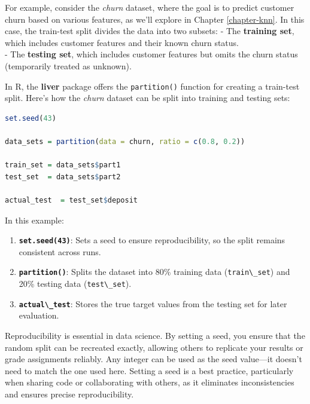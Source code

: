 \documentclass[
]{book}
\newcommand{\passthrough}[1]{#1}
\providecommand{\tightlist}{%
  \setlength{\itemsep}{0pt}\setlength{\parskip}{0pt}}
\theoremstyle{definition}
\theoremstyle{definition}
\theoremstyle{definition}
\theoremstyle{definition}
\theoremstyle{remark}
\begin{document}
For example, consider the \emph{churn} dataset, where the goal is to predict customer churn based on various features, as we'll explore in Chapter \ref{chapter-knn}. In this case, the train-test split divides the data into two subsets:
- The \textbf{training set}, which includes customer features and their known churn status.\\
- The \textbf{testing set}, which includes customer features but omits the churn status (temporarily treated as unknown).

In R, the \textbf{liver} package offers the \passthrough{\lstinline!partition()!} function for creating a train-test split. Here's how the \emph{churn} dataset can be split into training and testing sets:

\begin{lstlisting}[language=R]
set.seed(43)

data_sets = partition(data = churn, ratio = c(0.8, 0.2))

train_set = data_sets$part1
test_set  = data_sets$part2

actual_test  = test_set$deposit
\end{lstlisting}

In this example:

\begin{enumerate}
\def\labelenumi{\arabic{enumi}.}
\tightlist
\item
  \textbf{\passthrough{\lstinline!set.seed(43)!}}: Sets a seed to ensure reproducibility, so the split remains consistent across runs.\\
\item
  \textbf{\passthrough{\lstinline!partition()!}}: Splits the dataset into 80\% training data (\passthrough{\lstinline!train\_set!}) and 20\% testing data (\passthrough{\lstinline!test\_set!}).\\
\item
  \textbf{\passthrough{\lstinline!actual\_test!}}: Stores the true target values from the testing set for later evaluation.
\end{enumerate}

Reproducibility is essential in data science. By setting a seed, you ensure that the random split can be recreated exactly, allowing others to replicate your results or grade assignments reliably. Any integer can be used as the seed value---it doesn't need to match the one used here. Setting a seed is a best practice, particularly when sharing code or collaborating with others, as it eliminates inconsistencies and ensures precise reproducibility.
\end{document}
